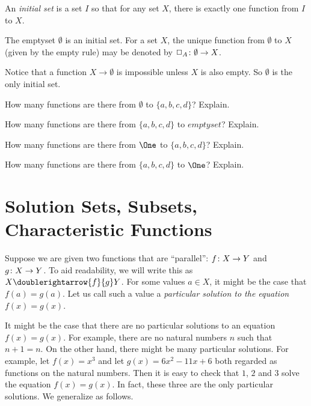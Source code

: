 \begin{defn}
	An \emph{initial set} is a set $I$ so that for any set $X$, there is exactly one function from $I$ to $X$.
\end{defn}

\begin{principle}
	The emptyset $\emptyset$ is an initial set. For a set $X$, the unique
	function from $\emptyset$ to $X$ (given by the empty rule) may be denoted by 
	${\Box_A}\colon{\emptyset}\to{X}$.
\end{principle}

Notice that a function $X\to\emptyset$ is impossible unless $X$ is also empty.
So $\emptyset$ is the only initial set. 

\begin{exercises}
	\begin{nextexercise}
		\item How many functions are there from $\emptyset$ to $\{a,b,c,d\}$? Explain.
		\item How many functions are there from $\{a,b,c,d\}$ to $emptyset$? Explain.
		\item How many functions are there from $\One$ to $\{a,b,c,d\}$? Explain.
		\item How many functions are there from $\{a,b,c,d\}$ to $\One$? Explain.
	\end{nextexercise}
\end{exercises}

\section{Solution Sets, Subsets, Characteristic Functions}

Suppose we are given two functions that are ``parallel'': ${f}\colon{X}\to{Y}$ and ${g}\colon{X}\to{Y}$. 
To aid readability, we will write this as $X\doublerightarrow{f}{g}Y$.
For some values $a\in X$, it might be the case that $f(a)=g(a)$.
Let us call such a value a \emph{particular solution to the equation $f(x)=g(x)$}. 

It might be the case that there are no particular solutions to an equation $f(x)=g(x)$.
For example, there are no natural numbers $n$ such that $n+1 = n$. 
On the other hand, there might be many particular solutions. 
For example, let $f(x)=x^3$ and let $g(x)= 6x^2 - 11x + 6$ both regarded as functions on the natural numbers.
Then it is easy to check that $1$, $2$ and $3$ solve the equation $f(x)=g(x)$.
In fact, these three are the only particular solutions.
We generalize as follows.

